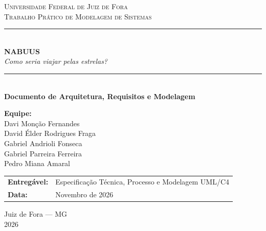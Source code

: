 \documentclass[12pt, a4paper]{article}
\begin{document}
\begin{titlepage}
    \centering
    \vspace*{2.2cm}

    {\large \textsc{Universidade Federal de Juiz de Fora}}\\[0.2cm]
    {\normalsize \textsc{Trabalho Prático de Modelagem de Sistemas}}\\[2.6cm]

    \rule{\textwidth}{1.5pt}\\[0.6cm]
    {\Huge \textbf{\textcolor{spaceblue}{NABUUS}}}\\[0.3cm]
    {\Large \textit{Como seria viajar pelas estrelas?}}\\[0.4cm]
    \rule{\textwidth}{1.5pt}\\[1.8cm]

    {\LARGE \textbf{Documento de Arquitetura, Requisitos e Modelagem}}\\[1.4cm]

    \begin{flushright}
        \large
        \textbf{Equipe:}\\
        Davi Monção Fernandes\\
        David Élder Rodrigues Fraga\\
        Gabriel Andrioli Fonseca\\
        Gabriel Parreira Ferreira\\
        Pedro Miana Amaral
    \end{flushright}
    \vspace{1cm}

    \begin{tabular}{p{4.5cm}p{7cm}}
        \toprule
        \textbf{Entregável:} & Especificação Técnica, Processo e Modelagem UML/C4 \\
        \textbf{Data:} & Novembro de 2026 \\
        \bottomrule
    \end{tabular}

    \vfill

    {\small Juiz de Fora --- MG \\ 2026}
\end{titlepage}

\setcounter{page}{1}
\end{document}
